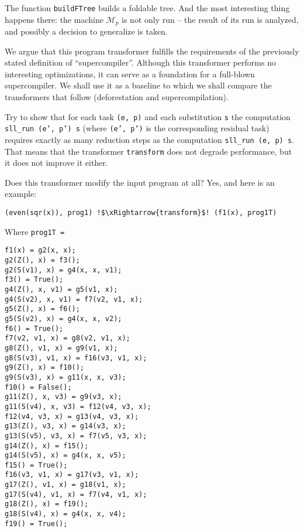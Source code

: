 The function \texttt{buildFTree} builds a foldable tree. 
 And the most interesting thing happens there:
the machine $\mathcal{M}_p$ is not only run -- the result of its run
is analyzed, and possibly a decision to generalize is taken.

We argue that this program transformer fulfills the requirements of the
previously stated definition of ``supercompiler''. 
Although this transformer performs no interesting optimizations, it
can serve as a foundation for a full-blown supercompiler.
We shall use it as a baseline to which we shall compare the
transformers that follow (deforestation and supercompilation).

\begin{exercise}
Try to show that for each task \texttt{(e, p)} and each substitution
\texttt{s} the computation \texttt{sll\_run (e', p') s} (where \texttt{(e', p')}
is the corresponding residual task) requires exactly as many reduction steps
as the computation \texttt{sll\_run (e, p) s}. 
That means that the transformer \texttt{transform} does not degrade performance,
but it does not improve it either.
\end{exercise}

Does this transformer modify the input program at all? Yes, and here is an example:
\begin{lstlisting}[language=sll,escapechar=!]
(even(sqr(x)), prog1) !$\xRightarrow{transform}$! (f1(x), prog1T)
\end{lstlisting}
Where \texttt{prog1T =}
\begin{lstlisting}[language=sll]
f1(x) = g2(x, x);
g2(Z(), x) = f3();
g2(S(v1), x) = g4(x, x, v1);
f3() = True();
g4(Z(), x, v1) = g5(v1, x);
g4(S(v2), x, v1) = f7(v2, v1, x);
g5(Z(), x) = f6();
g5(S(v2), x) = g4(x, x, v2);
f6() = True();
f7(v2, v1, x) = g8(v2, v1, x);
g8(Z(), v1, x) = g9(v1, x);
g8(S(v3), v1, x) = f16(v3, v1, x);
g9(Z(), x) = f10();
g9(S(v3), x) = g11(x, x, v3);
f10() = False();
g11(Z(), x, v3) = g9(v3, x);
g11(S(v4), x, v3) = f12(v4, v3, x);
f12(v4, v3, x) = g13(v4, v3, x);
g13(Z(), v3, x) = g14(v3, x);
g13(S(v5), v3, x) = f7(v5, v3, x);
g14(Z(), x) = f15();
g14(S(v5), x) = g4(x, x, v5);
f15() = True();
f16(v3, v1, x) = g17(v3, v1, x);
g17(Z(), v1, x) = g18(v1, x);
g17(S(v4), v1, x) = f7(v4, v1, x);
g18(Z(), x) = f19();
g18(S(v4), x) = g4(x, x, v4);
f19() = True();
\end{lstlisting}

